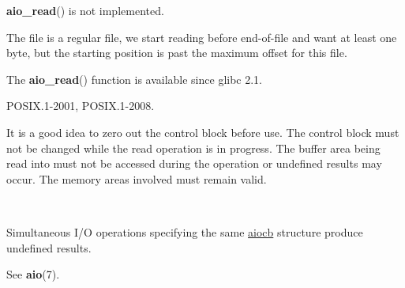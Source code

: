 \documentclass[]{article}
\let\realtextbf=\textbf
\renewcommand{\textbf}[1]{\textcolor{boldcolor}{\realtextbf{#1}}}
\renewcommand{\emph}[1]{\underline{#1}}
\begin{document}
\begin{description}
\itemsep1pt\parskip0pt
\item[\textbf{ENOSYS}]
\textbf{aio\_read}() is not implemented.
\end{description}

\begin{description}
\itemsep1pt\parskip0pt
\item[\textbf{EOVERFLOW}]
The file is a regular file, we start reading before end-of-file and want
at least one byte, but the starting position is past the maximum offset
for this file.
\end{description}


The \textbf{aio\_read}() function is available since glibc 2.1.


POSIX.1-2001, POSIX.1-2008.


It is a good idea to zero out the control block before use. The control
block must not be changed while the read operation is in progress. The
buffer area being read into must not be accessed during the operation or
undefined results may occur. The memory areas involved must remain
valid.

~

Simultaneous I/O operations specifying the same \emph{aiocb} structure
produce undefined results.


See \textbf{aio}(7).

\end{document}
